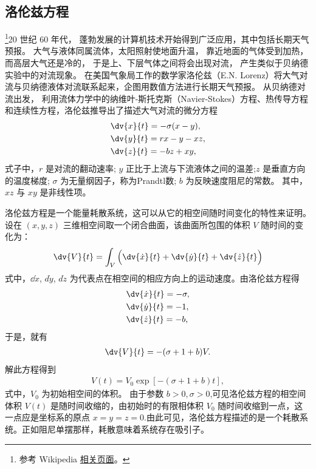 

\subsection{洛伦兹方程}

\footnote{参考 Wikipedia \href{https://en.wikipedia.org/wiki/Lorenz_system}{相关页面}。}20 世纪 60 年代， 蓬勃发展的计算机技术开始得到广泛应用，其中包括长期天气预报。 大气与液体同属流体，太阳照射使地面升温， 靠近地面的气体受到加热， 而高层大气还是冷的， 于是上、下层气体之间将会出现对流， 产生类似于贝纳德实验中的对流现象。 在美国气象局工作的数学家洛伦兹（E.N. Lorenz）将大气对流与贝纳德液体对流联系起来，企图用数值方法进行长期天气预报。 从贝纳德对流出发， 利用流体力学中的纳维叶-斯托克斯（Navier-Stokes）方程、热传导方程和连续性方程，洛伦兹推导出了描述大气对流的微分方程
\begin{align}
&\dv{x}{t}=-\sigma (x-y),\\
&\dv{y}{t}=rx-y-xz,\\
&\dv{z}{t}=-bz+xy,
\end{align}
式子中，$r$ 是对流的翻动速率; $y$ 正比于上流与下流液体之间的温差;$z$ 是垂直方向的温度梯度; $\sigma$ 为无量纲因子，称为Prandtl数; $b$ 为反映速度阻尼的常数。 其中，$xz$ 与 $xy$ 是非线性项。

洛伦兹方程是一个能量耗散系统，这可以从它的相空间随时间变化的特性来证明。设在 $(x,y, z)$ 三维相空间取一个闭合曲面，该曲面所包围的体积 $V$ 随时间的变化为：
\begin{align}
\dv{V}{t}=\int_V \Big(\dv{\dot{x}}{t}+\dv{\dot{y}}{t}+\dv{\dot{z}}{t}\Big)
\end{align}
式中，$\dd{\dot{x}}$, $d\dot{y}$, $d\dot{z}$ 为代表点在相空间的相应方向上的运动速度。由洛伦兹方程得
\begin{align}
&\dv{\dot{x}}{t}=-\sigma,\\
&\dv{\dot{y}}{t}=-1,\\
&\dv{\dot{z}}{t}=-b,
\end{align}
于是，就有
\begin{align}
\dv{V}{t}=-(\sigma+1+b)V.
\end{align}
解此方程得到
\begin{align}
V(t)=V_0\exp[-(\sigma+1+b)t],
\end{align}
式中，$V_0$ 为初始相空间的体积。 由于参数 $b>0,\sigma>0$,可见洛伦兹方程的相空间体积 $V(t)$ 是随时间收缩的，由初始时的有限相体积 $V_0$ 随时间收缩到一点，这一点应是坐标系的原点 $x=y=z=0$.由此可见，洛伦兹方程描述的是一个耗散系统。正如阻尼单摆那样，耗散意味着系统存在吸引子。

